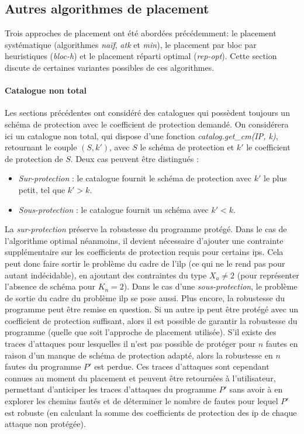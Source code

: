         \subsection{Autres algorithmes de placement}
        \label{sec:placement-other}

            Trois approches de placement ont été abordées précédemment: le placement systématique (algorithmes \textit{naïf}, \textit{atk} et \textit{min}), le placement par bloc par heuristiques (\textit{bloc-h}) et le placement réparti optimal (\textit{rep-opt}).
            Cette section discute de certaines variantes possibles de ces algorithmes.
            
            \paragraph{Catalogue non total}
            Les sections précédentes ont considéré des catalogues qui possèdent toujours un schéma de protection avec le coefficient de protection demandé.
            On considérera ici un catalogue non total, qui dispose d'une fonction \textit{catalog.get\_cm(IP, k)}, retournant le couple $(S, k')$, avec $S$ le schéma de protection et $k'$ le coefficient de protection de $S$. Deux cas peuvent être distingués : 
            \begin{itemize}
                \item \textit{Sur-protection} : le catalogue fournit le schéma de protection avec $k'$ le plus petit, tel que $k' > k$.
                \item \textit{Sous-protection} : le catalogue fournit un schéma avec $k' < k$.
            \end{itemize}
    
            La \textit{sur-protection} préserve la robustesse du programme protégé. Dans le cas de l'algorithme optimal néanmoins, il devient nécessaire d'ajouter une contrainte supplémentaire sur les coefficients de protection requis pour certains \gls{ip}s. Cela peut donc faire sortir le problème du cadre de l'\gls{ilp} (ce qui ne le rend pas pour autant indécidable), en ajoutant des contraintes du type $X_a \neq 2$ (pour représenter l'absence de schéma pour $K_n = 2$).
            Dans le cas d'une \textit{sous-protection}, le problème de sortie du cadre du problème \gls{ilp} se pose aussi.
            Plus encore, la robustesse du programme peut être remise en question. Si un autre \gls{ip} peut être protégé avec un coefficient de protection suffisant, alors il est possible de garantir la robustesse du programme (quelle que soit l'approche de placement utilisée).
            S'il existe des traces d'attaques pour lesquelles il n'est pas possible de protéger pour $n$ fautes en raison d'un manque de schéma de protection adapté, alors la robustesse en $n$ fautes du programme $P'$ est perdue.
            Ces traces d'attaques sont cependant connues au moment du placement et peuvent être retournées à l'utilisateur, permettant d'anticiper les traces d'attaques du programme $P'$ sans avoir à en explorer les chemins fautés et de déterminer le nombre de fautes pour lequel $P'$ est robuste (en calculant la somme des coefficients de protection des \gls{ip} de chaque attaque non protégée).
             
